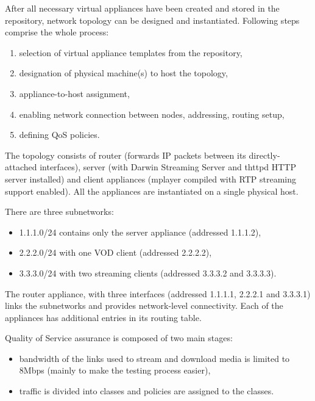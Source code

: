 \documentclass[11pt]{book}
\begin{document}
        After all necessary virtual appliances have been created and stored in the repository, network topology can be
        designed and instantiated. Following steps comprise the whole process:

        \begin{enumerate}
          \item selection of virtual appliance templates from the repository,
          \item designation of physical machine(s) to host the topology,
          \item appliance-to-host assignment,
          \item enabling network connection between nodes, addressing, routing setup,
          \item defining QoS policies.
        \end{enumerate}

        The topology consists of router (forwards IP packets between its directly-attached interfaces), server (with
        Darwin Streaming Server and thttpd HTTP server installed) and client appliances (mplayer compiled with RTP
        streaming support enabled). All the appliances are instantiated on a single physical host.

        There are three subnetworks:

        \begin{itemize}
          \item 1.1.1.0/24 contains only the server appliance (addressed 1.1.1.2),
          \item 2.2.2.0/24 with one VOD client (addressed 2.2.2.2),
          \item 3.3.3.0/24 with two streaming clients (addressed 3.3.3.2 and 3.3.3.3).
        \end{itemize}

        The router appliance, with three interfaces (addressed 1.1.1.1, 2.2.2.1 and 3.3.3.1) links the subnetworks and
        provides network-level connectivity. Each of the appliances has additional entries in its routing table.

        Quality of Service assurance is composed of two main stages:

        \begin{itemize}
          \item bandwidth of the links used to stream and download media is limited to 8Mbps (mainly to make the
                testing process easier),
          \item traffic is divided into classes and policies are assigned to the classes.
        \end{itemize}
\end{document}
